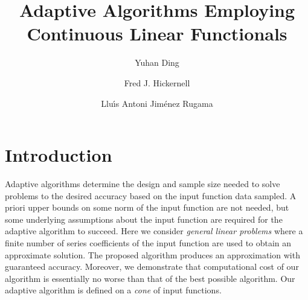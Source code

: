 \documentclass[final]{elsarticle}
\theoremstyle{definition}
\theoremstyle{remark}
\begin{document}
\begin{frontmatter}

\title{Adaptive Algorithms Employing Continuous Linear Functionals}
\author{Yuhan Ding}
\address{MCA 310, Department of Mathematics, Misericordia University,\\ 301 Lake St., Dallas, PA, 18612}
\author{Fred J. Hickernell}
\address{Center for Interdisciplinary Scientific Computation and \\
Department of Applied Mathematics, Illinois Institute of Technology \\ RE 208, 10 W.\ 32$^{\text{nd}}$ St., Chicago, IL 60616}
\author{Llu\'{\i}s Antoni Jim\'{e}nez Rugama}
\address{Department of Applied Mathematics, Illinois Institute of Technology,\\ RE 208, 10 W.\ 32$^{\text{nd}}$ St., Chicago, IL 60616}
\begin{abstract}
\end{abstract}

\begin{keyword}


\end{keyword}
\end{frontmatter}

\section{Introduction}
Adaptive algorithms determine the design and sample size needed to solve problems to the desired accuracy based on the input function data sampled.  A priori upper bounds on some norm of the input function are not needed, but some underlying assumptions about the input function are required for the adaptive algorithm to succeed.  Here we consider \emph{general linear problems} where a finite number of series coefficients of the input function are used to obtain an approximate solution.  The proposed algorithm produces an approximation with guaranteed accuracy.  Moreover, we demonstrate that  computational cost of our algorithm is essentially no worse than that of the best possible algorithm.  Our adaptive algorithm is defined on a \emph{cone} of input functions.
\end{document}
